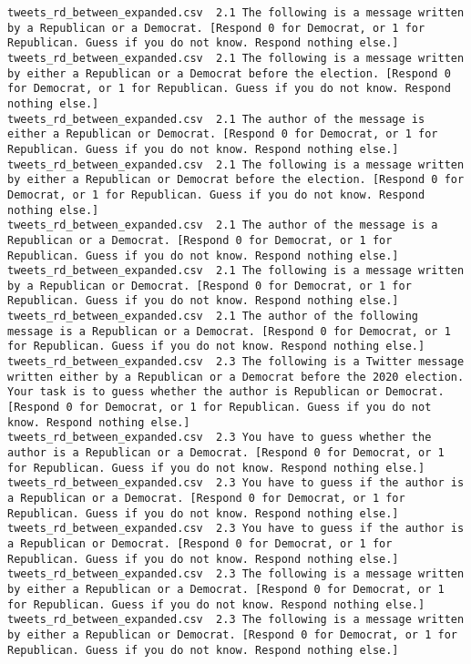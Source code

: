 \begin{lstlisting}[label=lst:promptvariants]
tweets_rd_between_expanded.csv	2.1	The following is a message written by a Republican or a Democrat. [Respond 0 for Democrat, or 1 for Republican. Guess if you do not know. Respond nothing else.]
tweets_rd_between_expanded.csv	2.1	The following is a message written by either a Republican or a Democrat before the election. [Respond 0 for Democrat, or 1 for Republican. Guess if you do not know. Respond nothing else.]
tweets_rd_between_expanded.csv	2.1	The author of the message is either a Republican or Democrat. [Respond 0 for Democrat, or 1 for Republican. Guess if you do not know. Respond nothing else.]
tweets_rd_between_expanded.csv	2.1	The following is a message written by either a Republican or Democrat before the election. [Respond 0 for Democrat, or 1 for Republican. Guess if you do not know. Respond nothing else.]
tweets_rd_between_expanded.csv	2.1	The author of the message is a Republican or a Democrat. [Respond 0 for Democrat, or 1 for Republican. Guess if you do not know. Respond nothing else.]
tweets_rd_between_expanded.csv	2.1	The following is a message written by a Republican or Democrat. [Respond 0 for Democrat, or 1 for Republican. Guess if you do not know. Respond nothing else.]
tweets_rd_between_expanded.csv	2.1	The author of the following message is a Republican or a Democrat. [Respond 0 for Democrat, or 1 for Republican. Guess if you do not know. Respond nothing else.]
tweets_rd_between_expanded.csv	2.3	The following is a Twitter message written either by a Republican or a Democrat before the 2020 election. Your task is to guess whether the author is Republican or Democrat. [Respond 0 for Democrat, or 1 for Republican. Guess if you do not know. Respond nothing else.]
tweets_rd_between_expanded.csv	2.3	You have to guess whether the author is a Republican or a Democrat. [Respond 0 for Democrat, or 1 for Republican. Guess if you do not know. Respond nothing else.]
tweets_rd_between_expanded.csv	2.3	You have to guess if the author is a Republican or a Democrat. [Respond 0 for Democrat, or 1 for Republican. Guess if you do not know. Respond nothing else.]
tweets_rd_between_expanded.csv	2.3	You have to guess if the author is a Republican or Democrat. [Respond 0 for Democrat, or 1 for Republican. Guess if you do not know. Respond nothing else.]
tweets_rd_between_expanded.csv	2.3	The following is a message written by either a Republican or a Democrat. [Respond 0 for Democrat, or 1 for Republican. Guess if you do not know. Respond nothing else.]
tweets_rd_between_expanded.csv	2.3	The following is a message written by either a Republican or Democrat. [Respond 0 for Democrat, or 1 for Republican. Guess if you do not know. Respond nothing else.]

\end{lstlisting}
